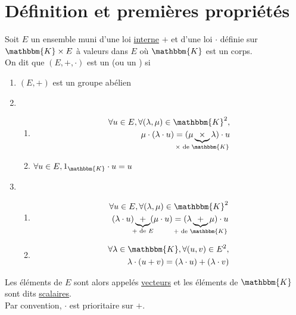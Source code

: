 \part{Définition et premières propriétés}

\begin{defn}
	Soit $E$ un ensemble muni d'une loi \underline{interne} $+$ et d'une loi $\cdot$ définie sur $\mathbbm{K}\times E$ à valeurs dans $E$ où $\mathbbm{K}$ est un corps.\\
	On dit que $(E,+,\cdot)$ est un  (ou un ) si
	\begin{enumerate}
		\item $(E,+)$ est un groupe abélien
		\item
			\begin{enumerate}
				\item
					\begin{align*}
						\forall u \in E, \forall (\lambda,\mu) \in \mathbbm{K}^2, \\
						\mu\cdot (\lambda\cdot u) = (\mu\underbrace{\times}_{\mathclap{\times \text{ de } \mathbbm{K}}}\lambda)\cdot u
					\end{align*}
				\item $\forall u \in E, 1_\mathbbm{K} \cdot u = u$
			\end{enumerate}
		\item
			\begin{enumerate}
				\item 
					\begin{align*}
						\forall u \in E, \forall (\lambda,\mu) \in \mathbbm{K}^2\\
						(\lambda\cdot u)\underbrace{+}_{\mathclap{+ \text{ de } E}} (\mu\cdot u) = (\lambda \underbrace{+}_{\mathclap{+ \text{ de } \mathbbm{K}}} \mu) \cdot u
					\end{align*}
				\item
					\begin{align*}
						\forall \lambda \in \mathbbm{K}, \forall (u,v) \in E^2,\\
						\lambda \cdot (u+v) = (\lambda \cdot u) + (\lambda \cdot v)
					\end{align*}
			\end{enumerate}
	\end{enumerate}

	Les éléments de $E$ sont alors appelés \underline{vecteurs} et les éléments de $\mathbbm{K}$ sont dits \underline{scalaires}.\\
	Par convention, $\cdot$ est prioritaire sur $+$.
\end{defn}

